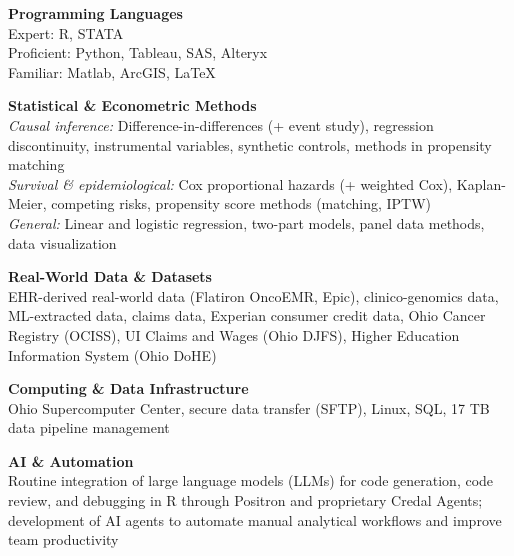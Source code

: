 \textbf{Programming Languages} \\
Expert: R, STATA \\
Proficient: Python, Tableau, SAS, Alteryx \\
Familiar: Matlab, ArcGIS, \LaTeX

\medskip
\textbf{Statistical \& Econometric Methods} \\
\textit{Causal inference:} Difference-in-differences (+ event study), regression discontinuity, instrumental variables, synthetic controls, methods in propensity matching \\
\textit{Survival \& epidemiological:} Cox proportional hazards (+ weighted Cox), Kaplan-Meier, competing risks, propensity score methods (matching, IPTW) \\
\textit{General:} Linear and logistic regression, two-part models, panel data methods, data visualization

\medskip
\textbf{Real-World Data \& Datasets} \\
EHR-derived real-world data (Flatiron OncoEMR, Epic), clinico-genomics data, ML-extracted data, claims data, Experian consumer credit data, Ohio Cancer Registry (OCISS), UI Claims and Wages (Ohio DJFS), Higher Education Information System (Ohio DoHE)

\medskip
\textbf{Computing \& Data Infrastructure} \\
Ohio Supercomputer Center, secure data transfer (SFTP), Linux, SQL, 
17 TB data pipeline management

\medskip
\textbf{AI \& Automation} \\
Routine integration of large language models (LLMs) for code generation, code review, 
and debugging in R through Positron and proprietary Credal Agents; development of AI agents to automate manual analytical workflows 
and improve team productivity